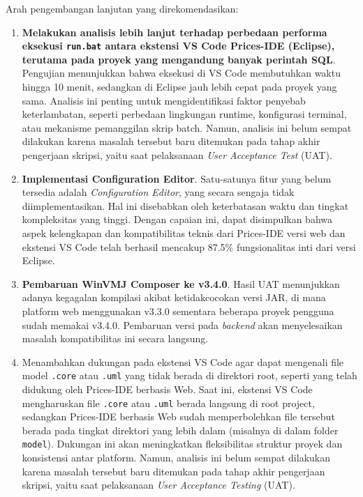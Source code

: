 \documentclass[12pt,a4paper,onecolumn]{article}
\begin{document}
Arah pengembangan lanjutan yang direkomendasikan:
\begin{enumerate}[leftmargin=*]

\item \textbf{Melakukan analisis lebih lanjut terhadap perbedaan performa eksekusi \texttt{run.bat} antara ekstensi VS Code Prices-IDE (Eclipse), terutama pada proyek yang mengandung banyak perintah SQL}. Pengujian menunjukkan bahwa eksekusi di VS Code membutuhkan waktu hingga 10 menit, sedangkan di Eclipse jauh lebih cepat pada proyek yang sama. Analisis ini penting untuk mengidentifikasi faktor penyebab keterlambatan, seperti perbedaan lingkungan runtime, konfigurasi terminal, atau mekanisme pemanggilan skrip batch. Namun, analisis ini belum sempat dilakukan karena masalah tersebut baru ditemukan pada tahap akhir pengerjaan skripsi, yaitu saat pelaksanaan \textit{User Acceptance Test} (UAT).

\item \textbf{Implementasi Configuration Editor}. Satu-satunya fitur yang belum tersedia adalah \textit{Configuration Editor}, yang secara sengaja tidak diimplementasikan. Hal ini disebabkan oleh keterbatasan waktu dan tingkat kompleksitas yang tinggi. Dengan capaian ini, dapat disimpulkan bahwa aspek kelengkapan dan kompatibilitas teknis dari Prices-IDE versi web dan ekstensi VS Code telah berhasil mencakup 87.5\% fungsionalitas inti dari versi Eclipse.
  
\item \textbf{Pembaruan WinVMJ Composer ke v3.4.0}. Hasil UAT menunjukkan adanya kegagalan kompilasi akibat ketidakcocokan versi JAR, di mana platform web menggunakan v3.3.0 sementara beberapa proyek pengguna sudah memakai v3.4.0. Pembaruan versi pada \textit{backend} akan menyelesaikan masalah kompatibilitas ini secara langsung.


\item Menambahkan dukungan pada ekstensi VS Code agar dapat mengenali file model \texttt{.core} atau \texttt{.uml} yang tidak berada di direktori root, seperti yang telah didukung oleh Prices-IDE berbasis Web. Saat ini, ekstensi VS Code mengharuskan file \texttt{.core} atau \texttt{.uml} berada langsung di root project, sedangkan Prices-IDE berbasis Web sudah memperbolehkan file tersebut berada pada tingkat direktori yang lebih dalam (misalnya di dalam folder \texttt{model}). Dukungan ini akan meningkatkan fleksibilitas struktur proyek dan konsistensi antar platform. Namun, analisis ini belum sempat dilakukan karena masalah tersebut baru ditemukan pada tahap akhir pengerjaan skripsi, yaitu saat pelaksanaan \textit{User Acceptance Testing} (UAT).


\end{enumerate}
\end{document}
